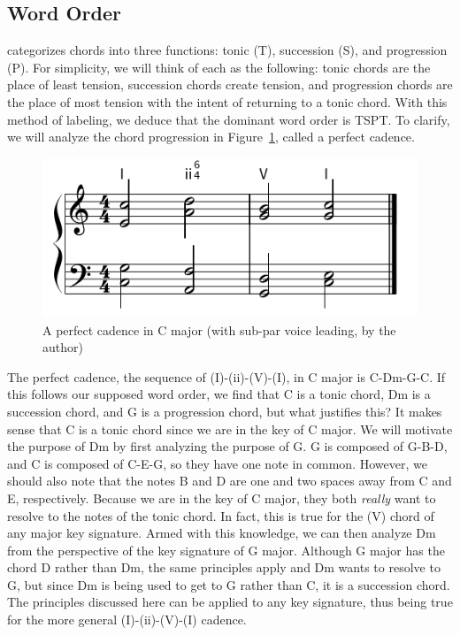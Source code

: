 \documentclass[12pt]{article}
\begin{document}
    \subsection*{Word Order}
    \textcite{schoenberg_1969} categorizes chords into three functions:
    tonic (T), succession (S), and progression (P). For simplicity, we will 
    think of each as the following: tonic chords are the place of least 
    tension, succession chords create tension, and progression chords are the
    place of most tension with the intent of returning to a tonic chord. With
    this method of labeling, we deduce that the dominant word order is TSPT\@.
    To clarify, we will analyze the chord progression in
    Figure~\ref{fig:c_perf_cad}, called a perfect cadence.
    \begin{figure}[H]
        \centering
        \includegraphics[width=0.5\linewidth]{1-2-5-1-demo.png}
        \caption{A perfect cadence in C major (with sub-par voice leading, by the author)}
        \label{fig:c_perf_cad}
    \end{figure}
    The perfect cadence, the sequence of (I)-(ii)-(V)-(I), in C major is
    C-Dm-G-C\@. If this follows our supposed word order, we find that C is a
    tonic chord, Dm is a succession chord, and G is a progression chord, but
    what justifies this? It makes sense that C is a tonic chord since we are
    in the key of C major. We will motivate the purpose of Dm by first
    analyzing the purpose of G\@. G is composed of G-B-D, and C is composed of
    C-E-G, so they have one note in common. However, we should also note that
    the notes B and D are one and two spaces away from C and E, respectively. 
    Because we are in the key of C major, they both \textit{really} want to
    resolve to the notes of the tonic chord. In fact, this is true for the (V)
    chord of any major key signature. Armed with this knowledge, we can then
    analyze Dm from the perspective of the key signature of G major. Although
    G major has the chord D rather than Dm, the same principles apply and Dm
    wants to resolve to G, but since Dm is being used to get to G rather than
    C, it is a succession chord. The principles discussed here can be applied
    to any key signature, thus being true for the more general
    (I)-(ii)-(V)-(I) cadence.
\end{document}
